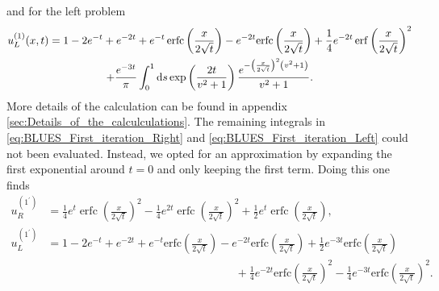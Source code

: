 \documentclass[amsmath,amssymb,amsfonts,aps,pre,preprint,superscriptaddress,bibnotes,showpacs,showkeys,longbibliography]{revtex4-1}
\DeclareMathOperator{\erfc}{erfc}
\begin{document}
and for the left problem
\begin{multline}\label{eq:BLUES_First_iteration_Left}
    u^{(1)}_L(x,t) =1-2 e^{-t}+e^{-2 t}+e^{-t} \erfc\left(\frac{x}{2 \sqrt{t}}\right)-e^{-2 t} \text{erfc}\left(\frac{x}{2 \sqrt{t}}\right)+\frac{1}{4} e^{-2 t} \erf\left(\frac{x}{2 \sqrt{t}}\right)^2
    \\+\frac{e^{-3 t}}{\pi } \int_0^1 \dd{s}\exp \left(\frac{2 t}{v^2+1}\right)\frac{ e^{-\left(\frac{x}{2 \sqrt{t}}\right)^2\left(v^2+1\right) }}{v^2+1}.
\end{multline} %
More details of the calculation can be found in appendix \ref{sec:Details_of_the_calculculations}. The remaining integrals in \eqref{eq:BLUES_First_iteration_Right} and \eqref{eq:BLUES_First_iteration_Left} could not been evaluated. Instead, we opted for an approximation by expanding the first exponential around $t=0$ and only keeping the first term. Doing this one finds
\begin{align}
    u^{(1^\prime)}_R 
    &= \frac{1}{4} e^t \erfc\left(\frac{x}{2 \sqrt{t}}\right)^2-\frac{1}{4} e^{2 t} \erfc\left(\frac{x}{2 \sqrt{t}}\right)^2+\frac{1}{2} e^t \erfc\left(\frac{x}{2 \sqrt{t}}\right),\\
    u^{(1^\prime)}_L
    &=1-2 e^{-t}+e^{-2 t}+e^{-t} \text{erfc}\left(\frac{x}{2 \sqrt{t}}\right)-e^{-2 t} \text{erfc}\left(\frac{x}{2 \sqrt{t}}\right)+\frac{1}{2} e^{-3 t} \text{erfc}\left(\frac{x}{2 \sqrt{t}}\right)\\
    &\hspace{7cm}+\frac{1}{4} e^{-2 t} \text{erfc}\left(\frac{x}{2 \sqrt{t}}\right)^2-\frac{1}{4} e^{-3 t} \text{erfc}\left(\frac{x}{2 \sqrt{t}}\right)^2.
\end{align}
\end{document}
